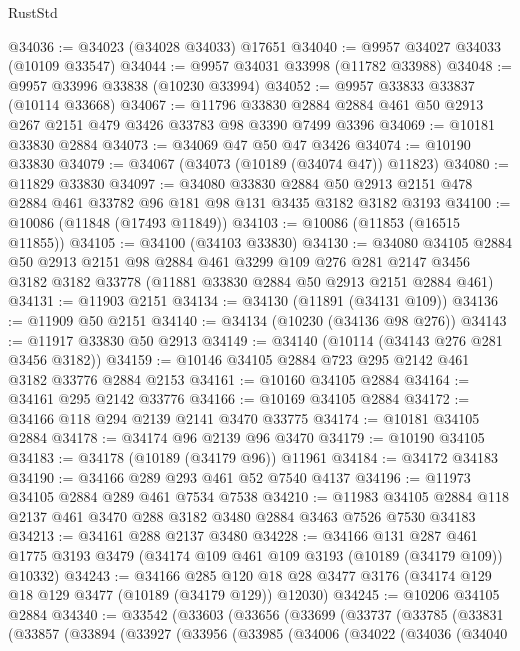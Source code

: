\begin{lexlean}{RustStd}
\begin{coremodule}
@34036 := @34023 (@34028 @34033) @17651
@34040 := @9957 @34027 @34033 (@10109 @33547)
@34044 := @9957 @34031 @33998 (@11782 @33988)
@34048 := @9957 @33996 @33838 (@10230 @33994)
@34052 := @9957 @33833 @33837 (@10114 @33668)
@34067 := @11796
    @33830
    @2884
    @2884
    @461
    @50
    @2913
    @267
    @2151
    @479
    @3426
    @33783
    @98
    @3390
    @7499
    @3396
@34069 := @10181 @33830 @2884
@34073 := @34069 @47 @50 @47 @3426
@34074 := @10190 @33830
@34079 := @34067 (@34073 (@10189 (@34074 @47)) @11823)
@34080 := @11829 @33830
@34097 := @34080
    @33830
    @2884
    @50
    @2913
    @2151
    @478
    @2884
    @461
    @33782
    @96
    @181
    @98
    @131
    @3435
    @3182
    @3182
    @3193
@34100 := @10086 (@11848 (@17493 @11849))
@34103 := @10086 (@11853 (@16515 @11855))
@34105 := @34100 (@34103 @33830)
@34130 := @34080
    @34105
    @2884
    @50
    @2913
    @2151
    @98
    @2884
    @461
    @3299
    @109
    @276
    @281
    @2147
    @3456
    @3182
    @3182
    @33778
    (@11881 @33830 @2884 @50 @2913 @2151 @2884 @461)
@34131 := @11903 @2151
@34134 := @34130 (@11891 (@34131 @109))
@34136 := @11909 @50 @2151
@34140 := @34134 (@10230 (@34136 @98 @276))
@34143 := @11917 @33830 @50 @2913
@34149 := @34140 (@10114 (@34143 @276 @281 @3456 @3182))
@34159 := @10146 @34105 @2884 @723 @295 @2142 @461 @3182 @33776 @2884 @2153
@34161 := @10160 @34105 @2884
@34164 := @34161 @295 @2142 @33776
@34166 := @10169 @34105 @2884
@34172 := @34166 @118 @294 @2139 @2141 @3470 @33775
@34174 := @10181 @34105 @2884
@34178 := @34174 @96 @2139 @96 @3470
@34179 := @10190 @34105
@34183 := @34178 (@10189 (@34179 @96)) @11961
@34184 := @34172 @34183
@34190 := @34166 @289 @293 @461 @52 @7540 @4137
@34196 := @11973 @34105 @2884 @289 @461 @7534 @7538
@34210 := @11983 @34105 @2884 @118 @2137 @461 @3470 @288 @3182 @3480 @2884 @3463 @7526 @7530 @34183
@34213 := @34161 @288 @2137 @3480
@34228 := @34166
    @131
    @287
    @461
    @1775
    @3193
    @3479
    (@34174 @109 @461 @109 @3193 (@10189 (@34179 @109)) @10332)
@34243 := @34166
    @285
    @120
    @18
    @28
    @3477
    @3176
    (@34174 @129 @18 @129 @3477 (@10189 (@34179 @129)) @12030)
@34245 := @10206 @34105 @2884
@34340 := @33542
    (@33603
      (@33656
        (@33699
          (@33737
            (@33785
              (@33831
                (@33857
                  (@33894
                    (@33927
                      (@33956
                        (@33985
                          (@34006
                            (@34022
                              (@34036
                                (@34040

\end{coremodule}
\end{lexlean}
